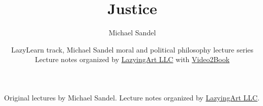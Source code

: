 \documentclass[11pt,oneside]{book}
\begin{document}
\title{Justice}
\author{Michael Sandel}
\date{LazyLearn track, Michael Sandel moral and political philosophy lecture series \\ Lecture notes organized by \href{https://lazying.art}{LazyingArt LLC} with \href{https://github.com/lachlanchen/Video2Book}{Video2Book}}
\maketitle
\begin{center}
\small Original lectures by Michael Sandel. Lecture notes organized by \href{https://lazying.art}{LazyingArt LLC}.
\end{center}
\clearpage
\tableofcontents
\mainmatter



















\end{document}
